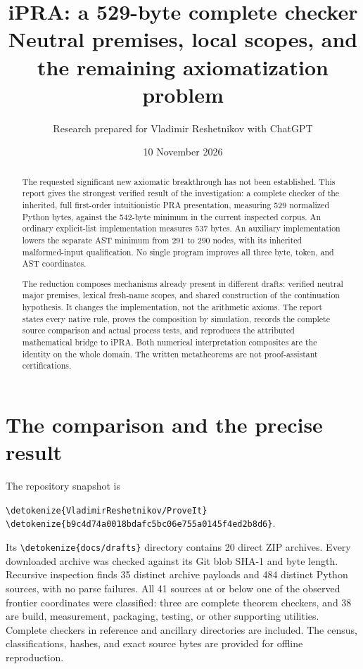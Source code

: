 \documentclass[11pt,letterpaper]{article}
\title{\color{ink}\bfseries iPRA: a 529-byte complete checker\\[8pt]
\large Neutral premises, local scopes, and the remaining axiomatization problem}
\author{Research prepared for Vladimir Reshetnikov with ChatGPT}
\date{10 November 2026}
\theoremstyle{definition}\newtheorem{definition}[theorem]{Definition}
\theoremstyle{remark}\newtheorem{remark}[theorem]{Remark}
\newcommand{\file}[1]{\expandafter\nolinkurl\expandafter{\detokenize{#1}}}
\begin{document}
\maketitle
\begin{abstract}
The requested significant new axiomatic breakthrough has not been established.
This report gives the strongest verified result of the investigation: a complete
checker of the inherited, full first-order intuitionistic PRA presentation,
measuring 529 normalized Python bytes, against the 542-byte minimum in the
current inspected corpus. An ordinary explicit-list implementation measures
537 bytes. An auxiliary implementation lowers the separate AST minimum from
291 to 290 nodes, with its inherited malformed-input qualification. No single
program improves all three byte, token, and AST coordinates.

The reduction composes mechanisms already present in different drafts:
verified neutral major premises, lexical fresh-name scopes, and shared
construction of the continuation hypothesis. It changes the implementation,
not the arithmetic axioms. The report states every native rule, proves the
composition by simulation, records the complete source comparison and actual
process tests, and reproduces the attributed mathematical bridge to iPRA.
Both numerical interpretation composites are the identity on the whole domain.
The written metatheorems are not proof-assistant certifications.
\end{abstract}
\begin{center}
\end{center}
\clearpage
\setcounter{tocdepth}{1}
\begingroup\small\setlength{\parskip}{0pt}\tableofcontents\endgroup
\clearpage

\section{The comparison and the precise result}

The repository snapshot is
\begin{center}\small
\file{VladimirReshetnikov/ProveIt}\quad
\file{b9c4d74a0018bdafc5bc06e755a0145f4ed2b8d6}.
\end{center}
Its \file{docs/drafts} directory contains 20 direct ZIP archives.
Every downloaded archive was checked against its Git blob SHA-1 and byte
length. Recursive inspection finds 35 distinct archive payloads and 484
distinct Python sources, with no parse failures. All 41 sources at or below
one of the observed frontier coordinates were classified: three are complete
theorem checkers, and 38 are build, measurement, packaging, testing, or other
supporting utilities. Complete checkers in reference and ancillary directories
are included. The census, classifications, hashes, and exact source bytes are
provided for offline reproduction.
\end{document}

